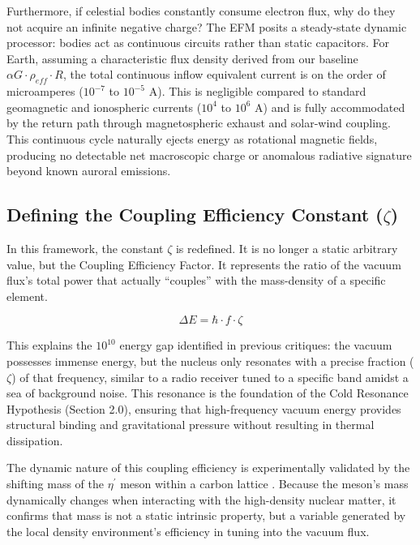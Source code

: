 \documentclass[11pt, a4paper]{article}
\begin{document}
Furthermore, if celestial bodies constantly consume electron flux, why do they not acquire an infinite negative charge? The EFM posits a steady-state dynamic processor: bodies act as continuous circuits rather than static capacitors. For Earth, assuming a characteristic flux density derived from our baseline $\alpha G \cdot \rho_{eff} \cdot R$, the total continuous inflow equivalent current is on the order of microamperes ($10^{-7}$ to $10^{-5}$ A). This is negligible compared to standard geomagnetic and ionospheric currents ($10^4$ to $10^6$ A) and is fully accommodated by the return path through magnetospheric exhaust and solar-wind coupling. This continuous cycle naturally ejects energy as rotational magnetic fields, producing no detectable net macroscopic charge or anomalous radiative signature beyond known auroral emissions.

\subsection{Defining the Coupling Efficiency Constant (\texorpdfstring{$\zeta$}{zeta})}
  In this framework, the constant $\zeta$ is redefined. It is no longer a static arbitrary value, but the Coupling Efficiency Factor. It represents the ratio of the vacuum flux's total power that actually ``couples'' with the mass-density of a specific element.

  \begin{equation}
    \Delta E=\hbar\cdot f\cdot\zeta
  \end{equation}

  This explains the $10^{10}$ energy gap identified in previous critiques: the vacuum possesses immense energy, but the nucleus only resonates with a precise fraction ($\zeta$) of that frequency, similar to a radio receiver tuned to a specific band amidst a sea of background noise. This resonance is the foundation of the Cold Resonance Hypothesis (Section 2.0), ensuring that high-frequency vacuum energy provides structural binding and gravitational pressure without resulting in thermal dissipation.

  The dynamic nature of this coupling efficiency is experimentally validated by the shifting mass of the $\eta^{\prime}$ meson within a carbon lattice \cite{mesic2026}. Because the meson's mass dynamically changes when interacting with the high-density nuclear matter, it confirms that mass is not a static intrinsic property, but a variable generated by the local density environment's efficiency in tuning into the vacuum flux.
\end{document}
